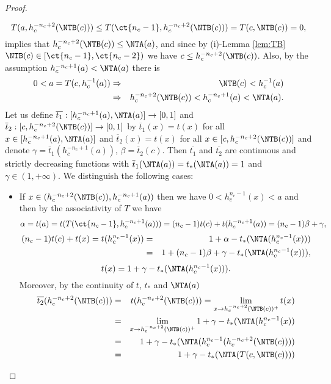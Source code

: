 \begin{proof}
\begin{enumerate}[label=(\roman*)]
\begin{itemize}
			$$T(a,h_c^{-n_c+2}(\NTB(c))) \leq T(\ct{n_c-1},h_c^{-n_c+2}(\NTB(c))) = T(c,\NTB(c))=0,$$
			implies that $h_c^{-n_c+2}(\NTB(c)) \leq \NTA(a)$, and since by (i)-Lemma \ref{lem:TB} $\NTB(c) \in [\ct{n_c-1},\ct{n_c-2})$ we have $c\leq h_c^{-n_c+2}(\NTB(c))$.   Also, by the assumption  \linebreak $h_c^{-n_c+1}(a)< \NTA(a)$ there is
			\begin{eqnarray*}
			0<a=T(c,h_c^{-1}(a)) & \Rightarrow & \NTB(c)<h_c^{-1}(a)\\
			& \Rightarrow & h_c^{-n_c+2}(\NTB(c)) <h_c^{-n_c+1}(a)< \NTA(a).
			\end{eqnarray*}
			Let us define
			$\overline{t_1}: [h_c^{-n_c+1}(a),\NTA(a)] \to [0,1]$
			and $\overline{t}_2: [c,h_c^{-n_c+2}(\NTB(c))] \to [0,1]$ by $\overline{t}_1(x)=t(x)$ for all $x\in [h_c^{-n_c+1}(a),\NTA(a)]$
			and $\overline{t}_2(x)=t(x)$ for all $x \in [c,h_c^{-n_c+2}(\NTB(c))]$ and denote $\gamma=\overline{t}_1(h_c^{-n_c+1}(a))$, $\beta=\overline{t}_2(c)$. Then
			$\overline{t_1}$ and $\overline{t_2}$ are continuous and strictly decreasing functions with $\overline{t}_1(\NTA(a))=t_*(\NTA(a))=1$ and $\gamma \in (1,+\infty)$. We distinguish the following cases:
			\begin{itemize}
				\item If $x \in (h_c^{-n_c+2}(\NTB(c)),h_c^{-n_c+1}(a))$ then we have $0 < h_c^{n_c-1}(x)<a$ and then by the associativity of $T$ we have
				$$\alpha=t(a)= t(T(\ct{n_c-1},h_c^{-n_c+1}(a))) = (n_c-1)t(c) + t(h_c^{-n_c+1}(a)) = (n_c-1)\beta + \gamma,$$
				\begin{eqnarray*}
					(n_c-1)t(c)+t(x) = t(h_c^{n_c-1}(x)) &=& 1 + \alpha - t_*(\NTA(h_c^{n_c-1}(x))) \\
					&=& 1 + (n_c-1)\beta + \gamma - t_*(\NTA(h_c^{n_c-1}(x))),
				\end{eqnarray*}
				\begin{equation}\label{eq:c5-1}
					t(x) = 1+ \gamma - t_*(\NTA(h_c^{n_c-1}(x))).
				\end{equation}
				Moreover, by the continuity of $t$, $t_*$ and $\NTA(a)$
				\begin{eqnarray*}
					\overline{t_2}(h_c^{-n_c+2}(\NTB(c))) &=& t(h_c^{-n_c+2}(\NTB(c))) = \lim_{x \to h_c^{-n_c+2}(\NTB(c))^+}t(x)  \\
					&=&  \lim_{x \to h_c^{-n_c+2}(\NTB(c))^+} 1+\gamma-t_*(\NTA(h_c^{n_c-1}(x)) \\
					&=&  1+\gamma-t_*(\NTA(h_c^{n_c-1}(h_c^{-n_c+2}(\NTB(c)))) \\
					&=& 1+\gamma-t_*(\NTA(T(c,\NTB(c)))) \\

\end{eqnarray*}
\end{itemize}
\end{itemize}
\end{enumerate}
\end{proof}
